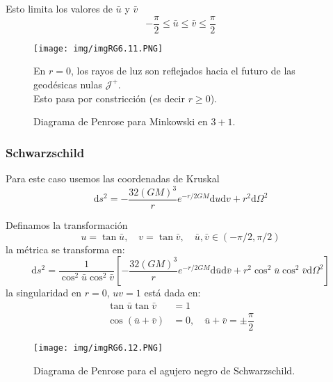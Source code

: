 \documentclass[../main]{subfiles}
\begin{document}
\begin{adjustwidth}{0pt}{-100pt}
Esto limita los valores de $\bar{u}$ y $\bar{v}$
\begin{equation}
    -\dfrac{\pi}{2}\leq \bar{u} \leq \bar{v} \leq \dfrac{\pi}{2}
\end{equation}
\begin{figure}[H]
    \begin{minipage}{0.6\textwidth}
        \centering
            \texttt{[image: img/imgRG6.11.PNG]}
            \caption{Diagrama de Penrose para Minkowski en $3+1$.}
    \end{minipage}
    \begin{minipage}{0.3\textwidth}
        \begin{adjustwidth}{20pt}{-80pt}    
        En $r=0$, los rayos de luz son reflejados hacia el futuro de las geodésicas nulas $\mathcal{J}^+$.
        \\
        Esto pasa por constricción (es decir $r\geq 0$).
        \end{adjustwidth}
    \end{minipage}
\end{figure}

\subsubsection{Schwarzschild}

Para este caso usemos las coordenadas de Kruskal
\begin{equation}
    \mathrm{d}s^2=-\dfrac{32(GM)^3}{r}e^{-r/2GM}\mathrm{d}u\mathrm{d}v+r^2\mathrm{d}\Omega^2
\end{equation}

Definamos la transformación
\begin{equation}
    u=\tan \bar{u},\quad v=\tan \bar{v},\quad \bar{u}, \bar{v} \in (-\pi/2, \pi/2)
\end{equation}
la métrica se transforma en:
\begin{equation}
    \mathrm{d}s^2 = \dfrac{1}{\cos^2 \bar{u} \cos^2 \bar{v}} \left[-\dfrac{32(GM)^3}{r}e^{-r/2GM}\mathrm{d}\bar{u}\mathrm{d}\bar{v}+r^2\cos^2 \bar{u}\cos^2 \bar{v}\mathrm{d}\Omega^2\right]
\end{equation}
la singularidad en $r=0$, $uv=1$ está dada en:
\begin{equation}
    \begin{split}
        \tan \bar{u} \tan \bar{v} &=1 \\
        \cos(\bar{u}+\bar{v})&=0,\quad \bar{u}+\bar{v}=\pm \dfrac{\pi}{2}
    \end{split}
\end{equation}
\begin{figure}[H]
    \begin{adjustwidth}{0pt}{-100pt}
    \centering
    \texttt{[image: img/imgRG6.12.PNG]}
    \caption{Diagrama de Penrose para el agujero negro de Schwarzschild.}
    \end{adjustwidth}
\end{figure}


\end{adjustwidth}
\end{document}
